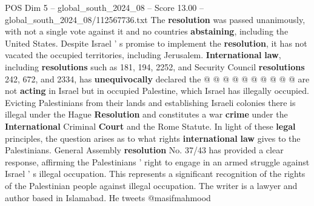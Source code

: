 \begin{textsample}{POS Dim 5 – global\_south\_2024\_08 – Score 13.00 – global\_south\_2024\_08/112567736.txt}
The \textbf{resolution} was passed unanimously, with not a single vote against it and no countries \textbf{abstaining}, including the United States.
Despite Israel ' s promise to implement the \textbf{resolution}, it has not vacated the occupied territories, including Jerusalem. \textbf{International} \textbf{law}, including \textbf{resolutions} such as 181, 194, 2252, and Security Council \textbf{resolutions} 242, 672, and 2334, has \textbf{unequivocally} declared the @ @ @ @ @ @ @ @ @ @ are not \textbf{acting} in Israel but in occupied Palestine, which Israel has illegally occupied.
Evicting Palestinians from their lands and establishing Israeli colonies there is illegal under the Hague \textbf{Resolution} and constitutes a war \textbf{crime} under the \textbf{International} Criminal \textbf{Court} and the Rome Statute.
In light of these \textbf{legal} principles, the question arises as to what rights \textbf{international} \textbf{law} gives to the Palestinians.
General Assembly \textbf{resolution} No. 37/43 has provided a clear response, affirming the Palestinians ' right to engage in an armed struggle against Israel ' s illegal occupation.
This represents a significant recognition of the rights of the Palestinian people against illegal occupation.
The writer is a lawyer and author based in Islamabad.
He tweets @masifmahmood

\end{textsample}
